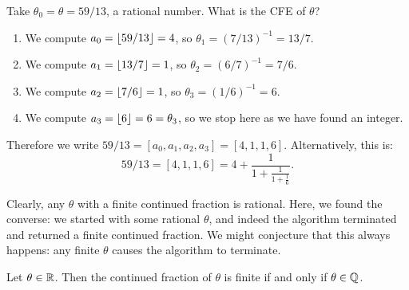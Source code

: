 \documentclass{article}
\begin{document}
\begin{example}
    Take $\theta_0 = \theta = 59/13$, a rational number. What is the CFE of $\theta$?
    \begin{enumerate}
	    \item We compute $a_0 = \left\lfloor59/13\right\rfloor = 4$, so $\theta_1 = (7/13)^{-1} = 13/7$.
	    \item We compute $a_1 = \left\lfloor13/7\right\rfloor = 1$, so $\theta_2 = (6/7)^{-1} = 7/6$.
	    \item We compute $a_2 = \left\lfloor7/6\right\rfloor = 1$, so $\theta_3 = (1/6)^{-1} = 6$.
	    \item We compute $a_3 = \left\lfloor6\right\rfloor = 6 = \theta_3$, so we stop here as we have found an integer.
	\end{enumerate}
	Therefore we write $59/13 = [a_0, a_1, a_2, a_3] = [4, 1, 1, 6]$. Alternatively, this is:
	\[
	59/13 = [4, 1, 1, 6] = 4 +
	\frac{1}{1 + \frac{1}{1 + \frac{1}{6}}}.
	\]
\end{example}

Clearly, any $\theta$ with a finite continued fraction is rational. Here, we found the converse: we started with some rational $\theta$, and indeed the algorithm terminated and returned a finite continued fraction. We might conjecture that this always happens: any finite $\theta$ causes the algorithm to terminate.

\begin{proposition}
    Let $\theta \in \mathbb{R}$. Then the continued fraction of $\theta$ is finite if and only if $\theta \in \mathbb{Q}$.
\end{proposition}
\end{document}
